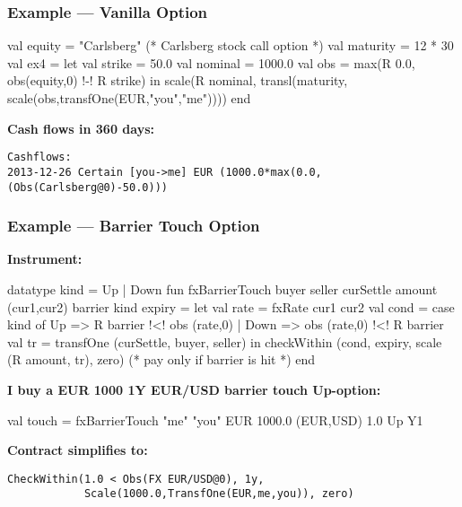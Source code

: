 \documentclass[xcolor=dvipsnames,11pt]{beamer}
\begin{document}
\begin{frame}[fragile,t]\frametitle{Example --- Vanilla Option}

\begin{mlcode}
val equity = "Carlsberg"  (* Carlsberg stock call option *)
val maturity = 12 * 30
val ex4 =
    let val strike = 50.0
        val nominal = 1000.0
        val obs = max(R 0.0, obs(equity,0) !-! R strike)
    in scale(R nominal,
             transl(maturity,
                    scale(obs,transfOne(EUR,"you","me"))))
    end
\end{mlcode}

\textbf{Cash flows in 360 days:}

\begin{scriptsize}
\begin{verbatim}
Cashflows:
2013-12-26 Certain [you->me] EUR (1000.0*max(0.0,(Obs(Carlsberg@0)-50.0)))
\end{verbatim}
\end{scriptsize}
\end{frame}

\begin{frame}[fragile,t]\frametitle{Example --- Barrier Touch Option}
\textbf{Instrument:}
\begin{mlcode}
datatype kind = Up | Down
fun fxBarrierTouch buyer seller curSettle amount
                   (cur1,cur2) barrier kind expiry =
  let val rate = fxRate cur1 cur2
      val cond = case kind of
                    Up   => R barrier !<! obs (rate,0)
                  | Down => obs (rate,0) !<! R barrier
      val tr   = transfOne (curSettle, buyer, seller)
  in checkWithin (cond, expiry,
                  scale (R amount, tr),
                  zero)    (* pay only if barrier is hit *)
  end
\end{mlcode}

\textbf{I buy a EUR 1000 1Y EUR/USD barrier touch Up-option:}
\begin{mlcode}
val touch =
 fxBarrierTouch "me" "you" EUR 1000.0 (EUR,USD) 1.0 Up Y1
\end{mlcode}

\textbf{Contract simplifies to:}
\begin{scriptsize}
\begin{verbatim}
CheckWithin(1.0 < Obs(FX EUR/USD@0), 1y, 
            Scale(1000.0,TransfOne(EUR,me,you)), zero)
\end{verbatim}
\end{scriptsize}
\end{frame}
\end{document}
